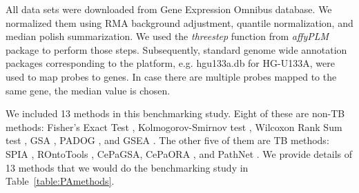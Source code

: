 \documentclass[Minh_PhD_thesis.tex]{subfiles}
\begin{document}

All   data sets were downloaded from Gene Expression Omnibus database. We normalized them using RMA background adjustment, quantile normalization, and median polish summarization.  We used the \textit{threestep} function from \textit{affyPLM} package to perform those steps. Subsequently, standard genome wide annotation packages corresponding to the platform, e.g. hgu133a.db for HG-U133A, were used to map probes to genes. In case there are multiple probes mapped to the same gene, the median value is chosen.

We included 13 methods in this benchmarking study. Eight of these are non-TB methods: Fisher's Exact Test \cite{Fisher:1951}, Kolmogorov-Smirnov test \cite{massey1951kolmogorov}, Wilcoxon Rank Sum test \cite{wilcoxon1945individual}, GSA \cite{Efron:2007}, PADOG \cite{Tarca2012down}, and GSEA \cite{Subramanian:2005}. The other five of them are TB methods: SPIA \cite{SPIAversion2.14.0}, ROntoTools \cite{RontoToolsVersion1.2.0}, CePaGSA, CePaORA \cite{gu2012centrality, gu2013cepa}, and PathNet \cite{Dutta:2012}. We provide details of 13 methods that we would do the benchmarking study in Table~\ref{table:PAmethods}. 
\end{document}
